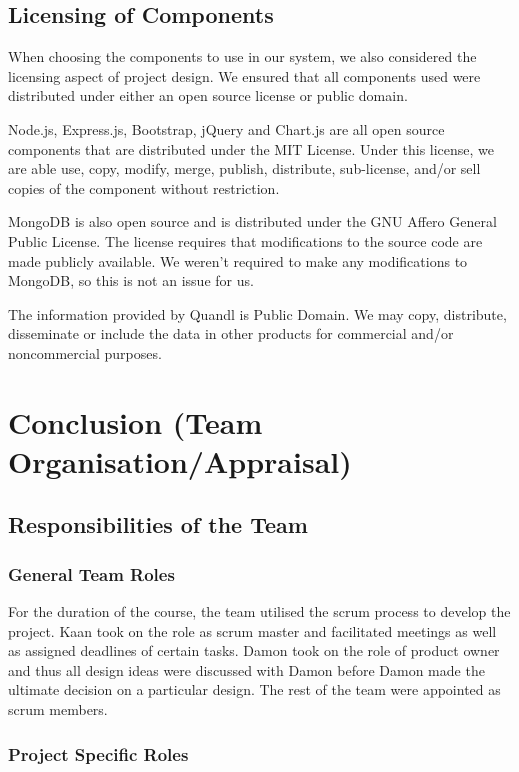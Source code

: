 \documentclass[11pt]{article}
\numberwithin{figure}{section}
\begin{document}
    \subsection{Licensing of Components}
        When choosing the components to use in our system, we also considered the licensing aspect of project design. We ensured that all components used were distributed under either an open source license or public domain.
        
        \bigskip
        \noindent
        Node.js, Express.js, Bootstrap, jQuery and Chart.js are all open source components that are distributed under the MIT License. Under this license, we are able use, copy, modify, merge, publish, distribute, sub-license, and/or sell copies of the component without restriction.
        
        \bigskip
        \noindent
        MongoDB is also open source and is distributed under the GNU Affero General Public License. The license requires that modifications to the source code are made publicly available. We weren't required to make any modifications to MongoDB, so this is not an issue for us.
        
        \bigskip
        \noindent
        The information provided by Quandl is Public Domain. We may copy, distribute, disseminate or include the data in other products for commercial and/or noncommercial purposes.
        
\section{Conclusion (Team Organisation/Appraisal)}
    \subsection{Responsibilities of the Team}
        \subsubsection{General Team Roles}
            For the duration of the course, the team utilised the scrum process to develop the project. Kaan took on the role as scrum master and facilitated meetings as well as assigned deadlines of certain tasks. Damon took on the role of product owner and thus all design ideas were discussed with Damon before Damon made the ultimate decision on a particular design. The rest of the team were appointed as scrum members.
            
        \subsubsection{Project Specific Roles}
            
\end{document}
